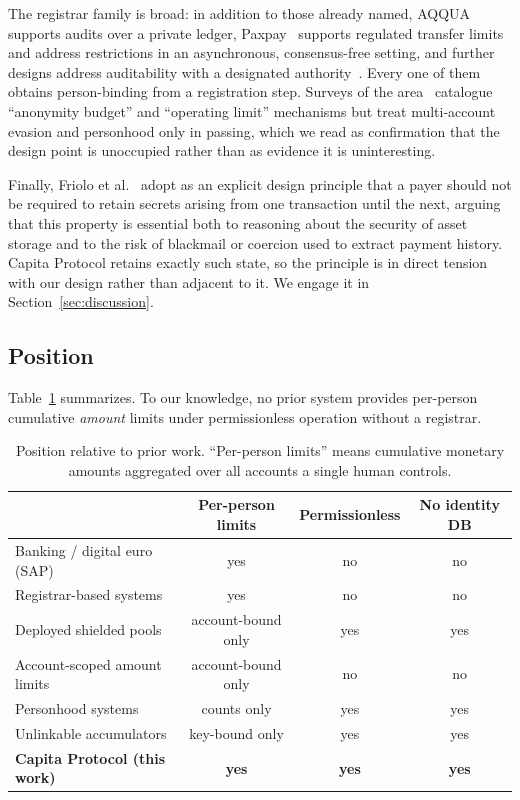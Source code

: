 \documentclass[11pt,a4paper]{article}
\theoremstyle{definition}
\theoremstyle{plain}
\theoremstyle{remark}
\begin{document}
The registrar family is broad: in addition to those already named, AQQUA~\cite{aqqua} supports audits over a private ledger, Paxpay~\cite{paxpay} supports regulated transfer limits and address restrictions in an asynchronous, consensus-free setting, and further designs address auditability with a designated authority~\cite{wdap,dart}. Every one of them obtains person-binding from a registration step. Surveys of the area~\cite{survey,sok} catalogue ``anonymity budget'' and ``operating limit'' mechanisms but treat multi-account evasion and personhood only in passing, which we read as confirmation that the design point is unoccupied rather than as evidence it is uninteresting.

Finally, Friolo et al.~\cite{friolo} adopt as an explicit design principle that a payer should not be required to retain secrets arising from one transaction until the next, arguing that this property is essential both to reasoning about the security of asset storage and to the risk of blackmail or coercion used to extract payment history. Capita Protocol retains exactly such state, so the principle is in direct tension with our design rather than adjacent to it. We engage it in Section~\ref{sec:discussion}.

\subsection{Position}

Table~\ref{tab:gap} summarizes. To our knowledge, no prior system provides per-person cumulative \emph{amount} limits under permissionless operation without a registrar.

\begin{table}[t]
\centering
\small
\setlength{\tabcolsep}{5pt}
\begin{tabular}{@{}lccc@{}}
\toprule
& \textbf{Per-person limits} & \textbf{Permissionless} & \textbf{No identity DB} \\
\midrule
Banking / digital euro (SAP) & yes & no & no \\
Registrar-based systems~\cite{utt,prcash,peredi,platypus} & yes & no & no \\
Deployed shielded pools~\cite{zcash} & account-bound only & yes & yes \\
Account-scoped amount limits~\cite{payoff,ulpcs} & account-bound only & no & no \\
Personhood systems~\cite{zkcreds,syra,ringvrf} & counts only & yes & yes \\
Unlinkable accumulators~\cite{bbaplus,uacs} & key-bound only & yes & yes \\
\textbf{Capita Protocol (this work)} & \textbf{yes} & \textbf{yes} & \textbf{yes} \\
\bottomrule
\end{tabular}
\caption{Position relative to prior work. ``Per-person limits'' means cumulative monetary amounts aggregated over all accounts a single human controls.}
\label{tab:gap}
\end{table}
\end{document}
